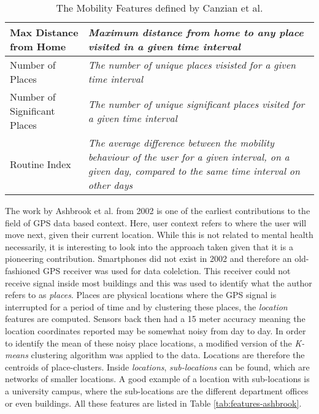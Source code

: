 \begin{table}[h]
\begin{tabular}{|p{}|p{}|}
Max Distance from Home       & \textit{Maximum distance from home to any place visited in a given time interval}                                                                                 \\ \hline
Number of Places             & \textit{The number of unique places visisted for a given time interval}                                                                                           \\ \hline
Number of Significant Places & \textit{The number of unique significant places visited for a given time interval}                                                                                \\ \hline
Routine Index                & \textit{The average difference between the mobility behaviour of the user for a given interval, on a given day, compared to the same time interval on other days} \\ \hline
\end{tabular}
    \caption{The Mobility Features defined by Canzian et al. \cite{Canzian2015}}
    \label{tab:canzian-features}
\end{table}


The work by Ashbrook et al. \cite{learning_significant_locations} from 2002 is one of the earliest contributions to the field of GPS data based context. Here, user context refers to where the user will move next, given their current location. While this is not related to mental health necessarily, it is interesting to look into the approach taken given that it is a pioneering contribution. Smartphones did not exist in 2002 and therefore an old-fashioned GPS receiver was used for data colelction. This receiver could not receive signal inside most buildings and this was used to identify what the author refers to as \textit{places}. Places are physical locations where the GPS signal is interrupted for a period of time and by clustering these places, the \textit{location} features are computed. Sensors back then had a 15 meter accuracy meaning the location coordinates reported may be somewhat noisy from day to day. In order to identify the mean of these noisy place locations, a modified version of the \textit{K-means} clustering algorithm was applied to the data. Locations are therefore the centroids of place-clusters. Inside \textit{locations}, \textit{sub-locations} can be found, which are networks of smaller locations. A good example of a location with sub-locations is a university campus, where the sub-locations are the different department offices or even buildings. All these features are listed in Table \ref{tab:features-ashbrook}. 

